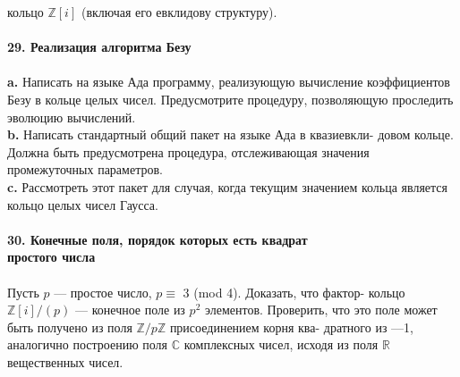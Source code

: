 кольцо $\mathbb{Z}[i]$ (включая его евклидову структуру). \\
\\
\noindent\textbf{29. Реализация алгоритма Безу}\\\\
\hspace*{10pt}\textbf{a.} Написать на языке Ада программу, реализующую вычисление\linebreak
коэффициентов Безу в кольце целых чисел. Предусмотрите процедуру,\linebreak
позволяющую проследить эволюцию вычислений.\\
\hspace*{10pt}\textbf{b.} Написать стандартный общий пакет на языке Ада в квазиевкли-\linebreak
довом кольце. Должна быть предусмотрена процедура, отслеживающая\linebreak
значения промежуточных параметров. \\
\hspace*{10pt}\textbf{c.} Рассмотреть этот пакет для случая, когда текущим значением
кольца является кольцо целых чисел Гаусса.
\\
\\
\noindent\textbf{30. Конечные поля, порядок которых есть квадрат\\
простого числа}\\\\
\hspace*{10pt} Пусть $p$ — простое число, $p \equiv$ 3 (mod 4). Доказать, что фактор-\linebreak
кольцо $\mathbb{Z}[i]/(p)$ — конечное поле из $p^2$ элементов. Проверить, что это\linebreak
поле может быть получено из поля  $\mathbb{Z}/p\mathbb{Z}$ присоединением корня ква-\linebreak
дратного из —1, аналогично построению поля $\mathbb{C}$ комплексных чисел,\linebreak
исходя из поля $\mathbb{R}$ вещественных чисел.
\pagebreak


